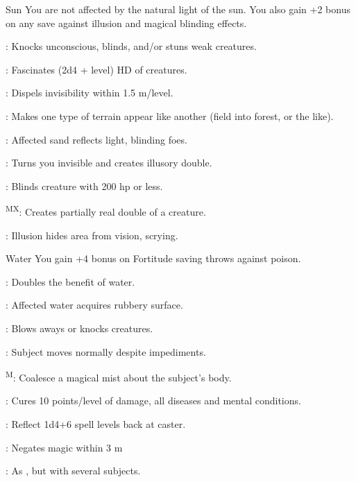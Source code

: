 {Sun}
{You are not affected by the natural light of the sun. You also gain +2 bonus on any save against illusion and magical blinding effects.}
{
	\item {}: Knocks unconscious, blinds, and/or stuns weak creatures.
	\item {}: Fascinates (2d4 + level) HD of creatures.
	\item {}: Dispels invisibility within 1.5 m/level.
	\item {}: Makes one type of terrain appear like another (field into forest, or the like).
	\item {}: Affected sand reflects light, blinding foes.
	\item {}: Turns you invisible and creates illusory double.
	\item {}: Blinds creature with 200 hp or less.
	\item {}\textsuperscript{MX}: Creates partially real double of a creature.
	\item {}: Illusion hides area from vision, scrying.
}

{Water}
{You gain +4 bonus on Fortitude saving throws against poison.}
{
	\item {}: Doubles the benefit of water.
	\item {}: Affected water acquires rubbery surface.
	\item {}: Blows aways or knocks creatures.
	\item {}: Subject moves normally despite impediments.
	\item {}\textsuperscript{M}: Coalesce a magical mist about the subject's body.
	\item {}: Cures 10 points/level of damage, all diseases and mental conditions.
	\item {}: Reflect 1d4+6 spell levels back at caster.
	\item {}: Negates magic within 3 m
	\item {}: As , but with several subjects.
}

